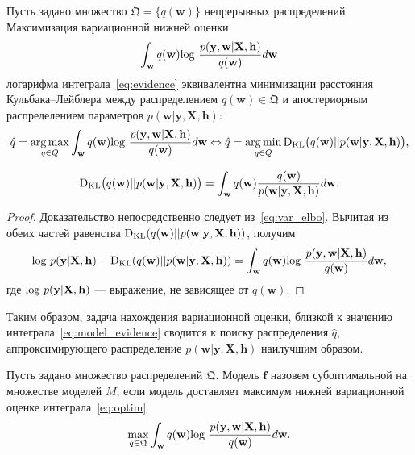 \begin{theorem}\label{st:st1} Пусть задано множество $\mathfrak{Q} = \{q(\mathbf{w})\}$ непрерывных распределений. Максимизация вариационной нижней оценки $$\int_{\mathbf{w}} q(\mathbf{w})\textnormal{log}~\frac{p(\mathbf{y},\mathbf{w}|\mathbf{X},\mathbf{h})}{q(\mathbf{w})}d\mathbf{w}$$  логарифма интеграла~\eqref{eq:evidence}  эквивалентна минимизации расстояния Кульбака--Лейблера между распределением $q(\mathbf{w}) \in \mathfrak{Q}$ и апостериорным распределением параметров $p(\mathbf{w}|\mathbf{y}, \mathbf{X}, \mathbf{h})$:
\begin{equation}
\label{eq:optim}
    \hat{q} = \operatorname*{arg\,max}_{q \in Q} \int_{\mathbf{w}} q(\mathbf{w})\textnormal{log}~\frac{p(\mathbf{y},\mathbf{w}|\mathbf{X},\mathbf{h})}{q(\mathbf{w})}d\mathbf{w} \Leftrightarrow 	
    \hat{q} = \operatorname*{arg\,min}_{q \in Q} \textnormal{D}_\textnormal{KL}  \bigl(q(\mathbf{w})||p(\mathbf{w}|\mathbf{y}, \mathbf{X}, \mathbf{h})\bigr),
\end{equation}

\[
	\textnormal{D}_\textnormal{KL}  \bigl(q(\mathbf{w})||p(\mathbf{w}|\mathbf{y}, \mathbf{X}, \mathbf{h})\bigr) =  \int_\mathbf{w} q(\mathbf{w}) \frac{q(\mathbf{w})}{p(\mathbf{w}|\mathbf{y}, \mathbf{X}, \mathbf{h})} d\mathbf{w}.
\]

\end{theorem}
\begin{proof}
Доказательство непосредственно следует из~\eqref{eq:var_elbo}. Вычитая из обеих частей равенства $\textnormal{D}_\textnormal{KL}  (q(\mathbf{w})||p(\mathbf{w}|\mathbf{y}, \mathbf{X}, \mathbf{h}))$, получим
\[
\textnormal{log}~p(\mathbf{y}|\mathbf{X},\mathbf{h}) - \textnormal{D}_\textnormal{KL}  (q(\mathbf{w})||p(\mathbf{w}|\mathbf{y}, \mathbf{X}, \mathbf{h}))  = \int_{\mathbf{w}} q(\mathbf{w})\textnormal{log}~\frac{p(\mathbf{y},\mathbf{w}|\mathbf{X},\mathbf{h})}{q(\mathbf{w})}d\mathbf{w},
\]
где $\textnormal{log}~p(\mathbf{y}|\mathbf{X},\mathbf{h})$ --- выражение, не зависящее от $q(\mathbf{w})$.
\end{proof}



Таким образом, задача нахождения вариационной оценки, близкой к значению интеграла~\eqref{eq:model_evidence} сводится к поиску распределения $\hat{q}$, аппроксимирующего распределение $p(\mathbf{w}|\mathbf{y}, \mathbf{X}, \mathbf{h})$ наилучшим образом. 

\begin{defin} Пусть задано множество распределений $\mathfrak{Q}$. Модель $\mathbf{f}$ назовем субоптимальной на множестве моделей $M$, если модель доставляет максимум нижней вариационной оценке интеграла~\eqref{eq:optim}
\begin{equation}
\label{eq:var_elbo2}
	\max_{q \in \mathfrak{Q}}\int_{\mathbf{w}} q(\mathbf{w})\textnormal{log}~\frac{p(\mathbf{y},\mathbf{w}|\mathbf{X},\mathbf{h})}{q(\mathbf{w})}d\mathbf{w}.
\end{equation}
\end{defin}

